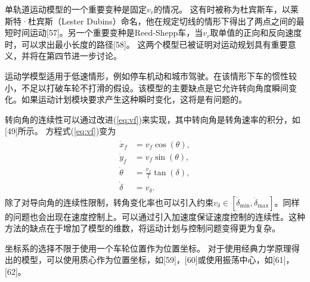 单轨道运动模型的一个重要变种是固定$v_r$的情况。 这有时被称为杜宾斯车，以莱斯特·杜宾斯（Lester Dubins）命名，他在规定切线的情形下得出了两点之间的最短时间运动[57]。另一个重要变种是Reed-Shepp车，当$v_r$取单值的正向和反向速度时，可以求出最小长度的路径[58]。 这两个模型已被证明对运动规划具有重要意义，并将在第四节进一步讨论。

运动学模型适用于低速情形，例如停车机动和城市驾驶。在该情形下车的惯性较小，不足以打破车轮不打滑的假设。该模型的主要缺点是它允许转向角度瞬间变化。如果运动计划模块要求产生这种瞬时变化，这将是有问题的。

转向角的连续性可以通过改进(\ref{eq:vf})来实现，其中转向角是转角速率的积分，如[49]所示。 方程式(\ref{eq:vf})变为
\begin{align}
\begin{split}
\dot{x}_f&= v_f\cos(\theta),\\
\dot{y}_f&= v_f\sin(\theta),\\
\dot{\theta}&=\frac{v_f}{l}\tan(\delta),\\
\dot{\delta}&=v_{\delta}.
\end{split}
\end{align}
除了对导向角的连续性限制，转角变化率也可以引入约束$v_{\delta}\in [\dot{\delta}_{\min},\dot{\delta}_{\max}]$。同样的问题也会出现在速度控制上。可以通过引入加速度保证速度控制的连续性。这种方法的缺点在于增加了模型的维数，将运动计划与控制问题变得更为复杂。

坐标系的选择不限于使用一个车轮位置作为位置坐标。 对于使用经典力学原理得出的模型，可以使用质心作为位置坐标，如[59]，[60]或使用振荡中心，如[61]，[62]。
